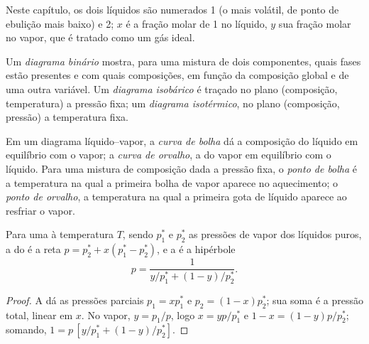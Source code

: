 Neste capítulo, os dois líquidos são numerados 1 (o mais volátil, de ponto
de ebulição mais baixo) e 2; $x$ é a fração molar de 1 no líquido, $y$ sua
fração molar no vapor, que é tratado como um gás ideal.

\begin{definition}\label{def:b2:liquid-vapour-diagrams:binary-diagram}
Um \emph{diagrama binário} mostra, para uma mistura de dois
componentes, quais fases estão presentes e com quais composições, em função
da composição global e de uma outra variável. Um
\emph{diagrama isobárico} é traçado no plano
(composição, temperatura) a pressão fixa; um \emph{diagrama
isotérmico}, no plano (composição, pressão) a
temperatura fixa.
\end{definition}

\begin{definition}\label{def:b2:liquid-vapour-diagrams:bubble-dew}
Em um diagrama líquido--vapor, a \emph{curva de bolha} dá
a composição do líquido em equilíbrio com o vapor; a \emph{curva de
orvalho}, a do vapor em equilíbrio com o líquido. Para uma
mistura de composição dada a pressão fixa, o \emph{ponto de
bolha} é a temperatura na qual a primeira bolha de
vapor aparece no aquecimento; o \emph{ponto de orvalho}, a
temperatura na qual a primeira gota de líquido aparece ao resfriar o vapor.
\end{definition}

\begin{proposition}\label{prop:b2:liquid-vapour-diagrams:ideal-curves}
Para uma  à temperatura $T$, sendo $p_1^*$ e $p_2^*$ as pressões
de vapor dos líquidos puros, a  do  é a
reta $p = p_2^* + x(p_1^* - p_2^*)$, e a  é a
hipérbole
\[
  p = \frac{1}{y/p_1^* + (1 - y)/p_2^*} .
\]
\end{proposition}

\begin{proof}
A  dá as pressões parciais $p_1 = xp_1^*$ e $p_2 = (1 -
x)p_2^*$; sua soma é a pressão total, linear em $x$. No vapor,
$y = p_1/p$, logo $x = yp/p_1^*$ e $1 - x = (1 - y)p/p_2^*$; somando,
$1 = p\,[y/p_1^* + (1 - y)/p_2^*]$.
\end{proof}

